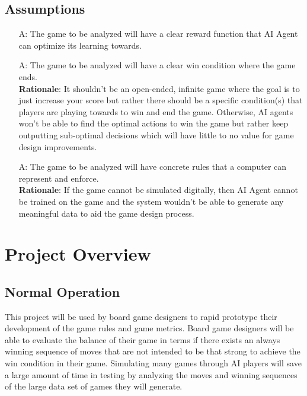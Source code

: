 \documentclass[12pt, titlepage]{article}
\newcounter{assumpnum}
\begin{document}
\subsection{Assumptions}
\begin{itemize}

\item[A\refstepcounter{assumpnum}\theassumpnum \label{A_Reward_Function}:]
  The game to be analyzed will have a clear reward function that AI Agent can optimize its learning towards.
  
\item[A\refstepcounter{assumpnum}\theassumpnum \label{A_End_Condition}:]
  The game to be analyzed will have a clear win condition where the game ends.\\ 
  \textbf{Rationale}: It shouldn't be an open-ended, infinite game where the goal is to just increase your score but rather there should be a specific condition(s) that players are playing towards to win and end the game. Otherwise, AI agents won't be able to find the optimal actions to win the game but rather keep outputting sub-optimal decisions which will have little to no value for game design improvements.
  
\item[A\refstepcounter{assumpnum}\theassumpnum \label{A_Representable}:]
  The game to be analyzed will have concrete rules that a computer can represent and enforce.\\
  \textbf{Rationale}: If the game cannot be simulated digitally, then AI Agent cannot be trained on the game and the system wouldn't be able to generate any meaningful data to aid the game design process.

\end{itemize}
\section{Project Overview}
\subsection{Normal Operation}
This project will be used by board game designers to rapid prototype their development of the game rules and game metrics. Board game designers will be able to evaluate the balance of their game in terms if there exists an always winning sequence of moves that are not intended to be that strong to achieve the win condition in their game. Simulating many games through AI players will save a large amount of time in testing by analyzing the moves and winning sequences of the large data set of games they will generate.
\end{document}
